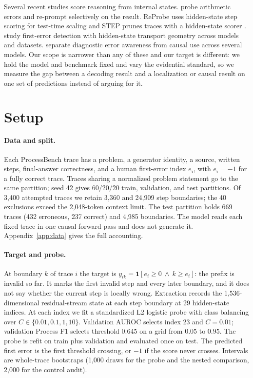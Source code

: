 \documentclass{article}
\newcommand{\dataset}{ProcessBench}
\begin{document}
Several recent studies score reasoning from internal states. \citet{sun2025arithmetic} probe
arithmetic errors and re-prompt selectively on the result. ReProbe uses hidden-state step scoring
for test-time scaling and STEP prunes traces with a hidden-state scorer
\citep{ni2026reprobe,liang2026earlysignals}. \citet{alvarez2026reasoningbreak} study first-error
detection with hidden-state transport geometry across models and datasets.
\citet{yuan2026hiddenerror} separate diagnostic error awareness from causal use across several
models. Our scope is narrower than any of these and our target is different: we hold the model and
benchmark fixed and vary the evidential standard, so we measure the gap between a decoding result
and a localization or causal result on one set of predictions instead of arguing for it.

\section{Setup}
\label{sec:setup}

\paragraph{Data and split.}
Each \dataset{} trace has a problem, a generator identity, a source, written steps, final-answer
correctness, and a human first-error index $e_i$, with $e_i=-1$ for a fully correct trace. Traces
sharing a normalized problem statement go to the same partition; seed 42 gives 60/20/20 train,
validation, and test partitions. Of 3,400 attempted traces we retain 3,360 and 24,909 step
boundaries; the 40 exclusions exceed the 2,048-token context limit. The test partition holds 669
traces (432 erroneous, 237 correct) and 4,985 boundaries. The model reads each fixed trace in one
causal forward pass and does not generate it. Appendix~\ref{app:data} gives the full accounting.

\paragraph{Target and probe.}
At boundary $k$ of trace $i$ the target is $y_{ik}=\mathbf{1}[e_i\geq 0\ \wedge\ k\geq e_i]$: the
prefix is invalid so far. It marks the first invalid step and every later boundary, and it does not
say whether the current step is locally wrong. Extraction records the 1{,}536-dimensional
residual-stream state at each step boundary at 29 hidden-state indices. At each index we fit a
standardized L2 logistic probe with class balancing over $C\in\{0.01,0.1,1,10\}$. Validation AUROC
selects index 23 and $C=0.01$; validation Process F1 selects threshold $0.645$ on a grid from
$0.05$ to $0.95$. The probe is refit on train plus validation and evaluated once on test. The
predicted first error is the first threshold crossing, or $-1$ if the score never crosses. Intervals
are whole-trace bootstraps (1{,}000 draws for the probe and the nested comparison, 2{,}000 for the
control audit).
\end{document}
